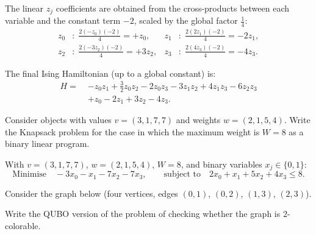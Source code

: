 \documentclass{ceri/sty/rapport}
\newcounter{exercice}[section]
\begin{document}
\begin{solution}
\medskip
The linear $z_j$ coefficients are obtained from the cross-products between each variable and the constant term $-2$, scaled by the global factor $\tfrac{1}{4}$:
\begin{align*}
  z_0 &:\; \frac{2(-z_0)(-2)}{4} = +z_0, &
  z_1 &:\; \frac{2(2z_1)(-2)}{4} = -2z_1, \\
  z_2 &:\; \frac{2(-3z_2)(-2)}{4} = +3z_2, &
  z_3 &:\; \frac{2(4z_3)(-2)}{4} = -4z_3.
\end{align*}

The final Ising Hamiltonian (up to a global constant) is:
\begin{align*}
  H =\; & -z_0z_1 + \tfrac{3}{2}z_0z_2 - 2z_0z_3 - 3z_1z_2 + 4z_1z_3 - 6z_2z_3 \\
        & + z_0 - 2z_1 + 3z_2 - 4z_3.
\end{align*}
\end{solution}

\begin{exercice}[p.~115]
Consider objects with values $v = (3, 1, 7, 7)$ and weights $w = (2, 1, 5, 4)$.
Write the Knapsack problem for the case in which the maximum weight is $W = 8$
as a binary linear program.
\end{exercice}

\begin{solution}
With $v = (3,1,7,7)$, $w = (2,1,5,4)$, $W = 8$, and binary variables $x_j \in \{0,1\}$:
\[
  \text{Minimise} \quad -3x_0 - x_1 - 7x_2 - 7x_3,
  \qquad \text{subject to} \quad 2x_0 + x_1 + 5x_2 + 4x_3 \leq 8.
\]
\end{solution}

\begin{exercice}[p.~119]
Consider the graph below (four vertices, edges $(0,1)$, $(0,2)$, $(1,3)$, $(2,3)$).

\medskip
\begin{center}
\end{center}

\medskip
Write the QUBO version of the problem of checking whether the graph is $2$-colorable.
\end{exercice}
\end{document}
